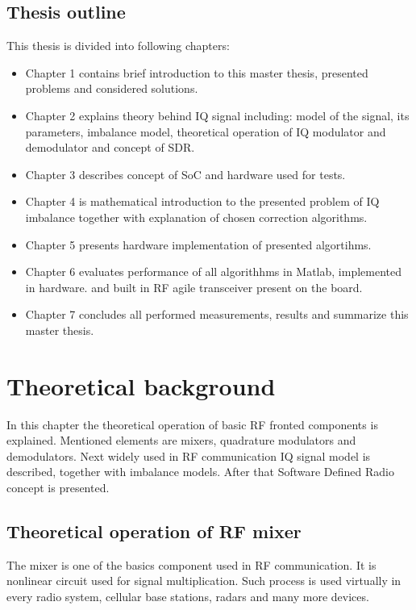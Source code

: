 \documentclass[en,printmode]{mgr}
\begin{document}
	\section{Thesis outline}
		This thesis is divided into following chapters:
		\begin{itemize}
			\item Chapter 1 contains brief introduction to this master thesis, presented problems and
				  considered solutions.
			\item Chapter 2 explains theory behind IQ signal including: model of the signal, its parameters,
			      imbalance model, theoretical operation of IQ modulator and demodulator and concept of SDR.
			\item Chapter 3 describes concept of SoC and hardware used for tests.
			\item Chapter 4 is mathematical introduction to the presented problem of IQ imbalance together
			      with explanation of chosen correction algorithms.
			\item Chapter 5 presents hardware implementation of presented algortihms.
			\item Chapter 6 evaluates performance of all algorithhms in Matlab, implemented in hardware.
			      and built in RF agile transceiver present on the board.
			\item Chapter 7 concludes all performed measurements, results and summarize this master thesis.
		\end{itemize}			
\chapter{Theoretical background}
	In this chapter the theoretical operation of basic RF fronted components is explained. Mentioned elements
	are mixers, quadrature modulators and demodulators. Next widely used in RF communication IQ signal model
	is described, together with imbalance models. After that Software Defined Radio concept is
	presented.

	\section{Theoretical operation of RF mixer}
		The mixer is one of the basics component used in RF communication. It is nonlinear circuit used for
		signal multiplication. Such process is used virtually in every radio system, cellular base stations,
		radars and many more devices. 
		\\
		
\end{document}
